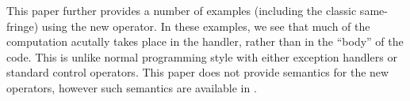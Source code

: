 \documentclass[12pt]{article}
\begin{document}
This paper further provides a number of examples (including the
classic same-fringe) using the new operator.  In these examples, we
see that much of the computation acutally takes place in the handler,
rather than in the ``body'' of the code.  This is unlike normal
programming style with either exception handlers or standard control
operators.  This paper does not provide semantics for the new
operators, however such semantics are available in
\cite{sitaram94thesis}.  


\end{document}
